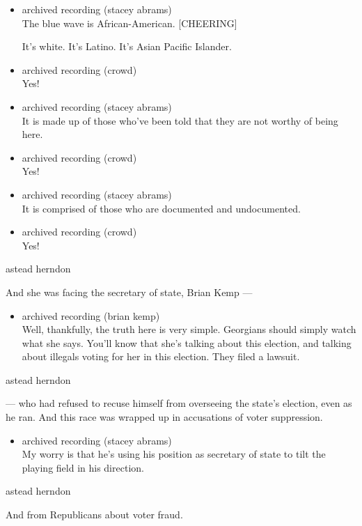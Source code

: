 \begin{itemize}
\item
  archived recording (stacey abrams)\\
  The blue wave is African-American. {[}CHEERING{]}

  It's white. It's Latino. It's Asian Pacific Islander.
\item
  archived recording (crowd)\\
  Yes!
\item
  archived recording (stacey abrams)\\
  It is made up of those who've been told that they are not worthy of
  being here.
\item
  archived recording (crowd)\\
  Yes!
\item
  archived recording (stacey abrams)\\
  It is comprised of those who are documented and undocumented.
\item
  archived recording (crowd)\\
  Yes!
\end{itemize}

astead herndon

And she was facing the secretary of state, Brian Kemp ---

\begin{itemize}
\tightlist
\item
  archived recording (brian kemp)\\
  Well, thankfully, the truth here is very simple. Georgians should
  simply watch what she says. You'll know that she's talking about this
  election, and talking about illegals voting for her in this election.
  They filed a lawsuit.
\end{itemize}

astead herndon

--- who had refused to recuse himself from overseeing the state's
election, even as he ran. And this race was wrapped up in accusations of
voter suppression.

\begin{itemize}
\tightlist
\item
  archived recording (stacey abrams)\\
  My worry is that he's using his position as secretary of state to tilt
  the playing field in his direction.
\end{itemize}

astead herndon

And from Republicans about voter fraud.


